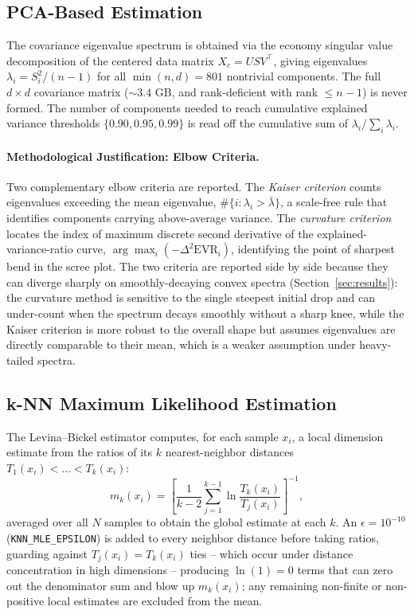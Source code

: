 \documentclass[11pt]{article}
\begin{document}
\subsection{PCA-Based Estimation}

The covariance eigenvalue spectrum is obtained via the economy singular
value decomposition of the centered data matrix
$X_c = U S V^\top$, giving eigenvalues $\lambda_i = S_i^2/(n-1)$ for all
$\min(n, d) = 801$ nontrivial components. The full $d \times d$ covariance
matrix ($\sim 3.4$ GB, and rank-deficient with rank $\le n-1$) is never
formed. The number of components needed to reach cumulative explained
variance thresholds $\{0.90, 0.95, 0.99\}$ is read off the cumulative sum
of $\lambda_i / \sum_i \lambda_i$.

\paragraph{Methodological Justification: Elbow Criteria.}
Two complementary elbow criteria are reported. The \emph{Kaiser criterion}
counts eigenvalues exceeding the mean eigenvalue, $\#\{i : \lambda_i >
\bar\lambda\}$, a scale-free rule that identifies components carrying
above-average variance. The \emph{curvature criterion} locates the index
of maximum discrete second derivative of the explained-variance-ratio
curve, $\arg\max_i \left(-\Delta^2 \text{EVR}_i\right)$, identifying the
point of sharpest bend in the scree plot. The two criteria are reported
side by side because they can diverge sharply on smoothly-decaying convex
spectra (Section~\ref{sec:results}): the curvature method is sensitive to
the single steepest initial drop and can under-count when the spectrum
decays smoothly without a sharp knee, while the Kaiser criterion is more
robust to the overall shape but assumes eigenvalues are directly
comparable to their mean, which is a weaker assumption under heavy-tailed
spectra.

\subsection{k-NN Maximum Likelihood Estimation}

The Levina--Bickel estimator computes, for each sample $x_i$, a local
dimension estimate from the ratios of its $k$ nearest-neighbor distances
$T_1(x_i) < \dots < T_k(x_i)$:
\begin{equation}
m_k(x_i) = \left[ \frac{1}{k-2} \sum_{j=1}^{k-1} \ln \frac{T_k(x_i)}{T_j(x_i)} \right]^{-1},
\label{eq:lb-mle}
\end{equation}
averaged over all $N$ samples to obtain the global estimate at each $k$.
An $\epsilon = 10^{-10}$ (\texttt{KNN\_MLE\_EPSILON}) is added to every
neighbor distance before taking ratios, guarding against
$T_j(x_i) = T_k(x_i)$ ties -- which occur under distance concentration in
high dimensions -- producing $\ln(1) = 0$ terms that can zero out the
denominator sum and blow up $m_k(x_i)$; any remaining non-finite or
non-positive local estimates are excluded from the mean.
\end{document}
